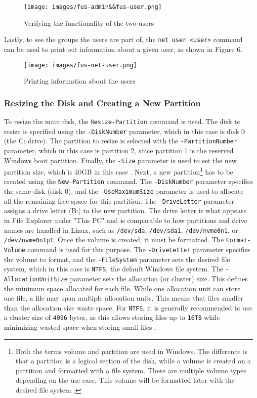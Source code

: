 \documentclass[a4paper]{article}
\newcommand{\abc}{\hfill \break}
\begin{document}
\begin{figure}[h]
	\texttt{[image: images/fus-admin\&\&fus-user.png]}
	\centering
	\caption{Verifying the functionality of the two users}
\end{figure}\newpage
Lastly, to see the groups the users are part of, the \texttt{net user <user>} command can be used to print out information about a given user, as shown in Figure 6.
\begin{figure}[h]
	\texttt{[image: images/fus-net-user.png]}
	\centering
	\caption{Printing information about the users}
\end{figure}\newpage
\subsubsection{Resizing the Disk and Creating a New Partition}
To resize the main disk, the \texttt{Resize-Partition} command is used. The disk to resize is specified using the \texttt{-DiskNumber} parameter, which in this case is disk 0 (the C: drive). The partition to resize is selected with the \texttt{-PartitionNumber} parameter, which in this case is partition 2, since partition 1 is the reserved Windows boot partition. Finally, the \texttt{-Size} parameter is used to set the new partition size, which is 40GB in this case \cite{Resize-Partition}.
Next, a new partition\footnote{Both the terms volume and partition are used in Windows. The difference is that a partition is a logical section of the disk, while a volume is created on a partition and formatted with a file system. There are multiple volume types depending on the use case. This volume will be formatted later with the desired file system \cite{Volumes}.} has to be created using the \texttt{New-Partition} command. The \texttt{-DiskNumber} parameter specifies the same disk (disk 0), and the \texttt{-UseMaximumSize} parameter is used to allocate all the remaining free space for this partition. The \texttt{-DriveLetter} parameter assigns a drive letter (B:) to the new partition. The drive letter is what appears in File Explorer under "This PC" and is comparable to how partitions and drive names are handled in Linux, such as \texttt{/dev/sda}, \texttt{/dev/sda1}, \texttt{/dev/nvme0n1}, or \texttt{/dev/nvme0n1p1}.\cite{New-Partition, Volumes}\abc
Once the volume is created, it must be formatted. The \texttt{Format-Volume} command is used for this purpose. The \texttt{-DriveLetter} parameter specifies the volume to format, and the \texttt{-FileSystem} parameter sets the desired file system, which in this case is \texttt{NTFS}, the default Windows file system. The \texttt{-AllocationUnitSize} parameter sets the allocation (or cluster) size. This defines the minimum space allocated for each file. While one allocation unit can store one file, a file may span multiple allocation units. This means that files smaller than the allocation size waste space. For \texttt{NTFS}, it is generally recommended to use a cluster size of \texttt{4096} bytes, as this allows storing files up to \texttt{16TB} while minimizing wasted space when storing small files \cite{Cluster-Size, Format-Volume, Cluster-Size-2}.
\end{document}
